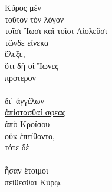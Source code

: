 
{\large
\begin{greek}
\noindent Κῦρος μὲν \\
\tabto{2em} τοῦτον τὸν λόγον \\
\tabto{2em} τοῖσι Ἴωσι καὶ τοῖσι Αἰολεῦσι \\
\tabto{2em} τῶνδε εἵνεκα \\
ἔλεξε, \\
\tabto{2em} ὅτι δὴ οἱ Ἴωνες \\
\tabto{4em} πρότερον \\
\tabto{4em}  \\
\tabto{6em} δι' ἀγγέλων \\
\tabto{6em} \underline{ἀπίστασθαί σφεας} \\
\tabto{8em} ἀπὸ Κροίσου \\
\tabto{2em} οὐκ ἐπείθοντο, \\
\tabto{2em} τότε δὲ \\
\tabto{4em}  \\
\tabto{2em} ἦσαν ἕτοιμοι \\
\tabto{4em} πείθεσθαι Κύρῳ.\\

\end{greek}
}

